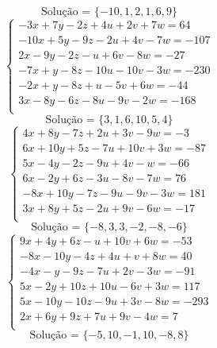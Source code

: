 \documentclass[12pt,oneside,a4paper]{article}
\begin{document}
\begin{equation*}
\text{Solução = }\{-10,1,2,1,6,9\}
\end{equation*}
\vspace{\baselineskip}
\begin{equation*}
\begin{cases}
-3x+7y-2z+4u+2v+7w=64 \\
-10x+5y-9z-2u+4v-7w=-107 \\
2x-9y-2z-u+6v-8w=-27 \\
-7x+y-8z-10u-10v-3w=-230 \\
-2x+y-8z+u-5v+6w=-44 \\
3x-8y-6z-8u-9v-2w=-168 \\
\end{cases}
\end{equation*}
\begin{equation*}
\text{Solução = }\{3,1,6,10,5,4\}
\end{equation*}
\vspace{\baselineskip}
\begin{equation*}
\begin{cases}
4x+8y-7z+2u+3v-9w=-3 \\
6x+10y+5z-7u+10v+3w=-87 \\
5x-4y-2z-9u+4v-w=-66 \\
6x-2y+6z-3u-8v-7w=76 \\
-8x+10y-7z-9u-9v-3w=181 \\
3x+8y+5z-2u+9v-6w=-17 \\
\end{cases}
\end{equation*}
\begin{equation*}
\text{Solução = }\{-8,3,3,-2,-8,-6\}
\end{equation*}
\vspace{\baselineskip}
\begin{equation*}
\begin{cases}
9x+4y+6z-u+10v+6w=-53 \\
-8x-10y-4z+4u+v+8w=40 \\
-4x-y-9z-7u+2v-3w=-91 \\
5x-2y+10z+10u-6v+3w=117 \\
5x-10y-10z-9u+3v-8w=-293 \\
2x+6y+9z+7u+9v-4w=7 \\
\end{cases}
\end{equation*}
\begin{equation*}
\text{Solução = }\{-5,10,-1,10,-8,8\}
\end{equation*}
\end{document}
